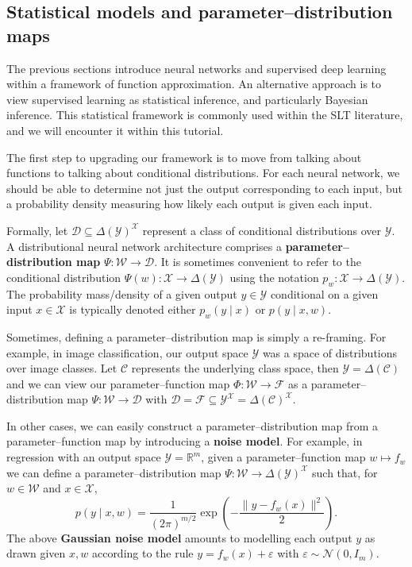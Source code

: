\documentclass[11pt]{article}
\newcommand{\R}{\mathbb{R}}
\newcommand{\X}{\mathcal{X}}
\newcommand{\Y}{\mathcal{Y}}
\newcommand{\W}{\mathcal{W}}
\newcommand{\F}{\mathcal{F}}
\newcommand{\D}{\mathcal{D}}
\newcommand{\C}{\mathcal{C}}
\begin{document}
\subsection{Statistical models and parameter--distribution maps}
\label{sec:prelims:stats}

The previous sections introduce neural networks and supervised deep learning
within a framework of function approximation. An alternative approach is to
view supervised learning as statistical inference, and particularly Bayesian
inference. This statistical framework is commonly used within the SLT
literature, and we will encounter it within this tutorial.

The first step to upgrading our framework is to move from talking about
functions to talking about conditional distributions. For each neural network,
we should be able to determine not just the output corresponding to each
input, but a probability density measuring how likely each output is given each
input.

Formally, let $\D \subseteq \Delta(\Y)^\X$ represent a class of
conditional distributions over $\Y$.
A distributional neural network architecture comprises a
\textbf{parameter--distribution map}
    $\Psi : \W \to \D$.
It is sometimes convenient to refer to the conditional distribution
    $\Psi(w) : \X \to \Delta(\Y)$
using the notation
    $p_w : \X \to \Delta(\Y)$.
The probability mass/density of a given output $y \in \Y$ conditional on a
given input $x \in \X$ is typically denoted either
    $p_w(y \mid x)$ or $p(y \mid x, w)$.

Sometimes, defining a parameter--distribution map is simply a re-framing. For
example, in image classification, our output space $\Y$ was a space of
distributions over image classes. Let $\C$ represents the underlying class
space, then $\Y = \Delta(\C)$ and we can view our parameter--function map
$\Phi : \W \to \F$ as a parameter--distribution map $\Psi : \W \to \D$ with
    $\D = \F \subseteq \Y^\X = \Delta(\C)^\X$.

In other cases, we can easily construct a parameter--distribution map from a
parameter--function map by introducing a \textbf{noise model}. For example, in
regression with an output space
    $\Y = \R^m$,
given a parameter--function map $w \mapsto f_w$ we can define a
parameter--distribution map
    $\Psi : \W \to \Delta(\Y)^\X$
such that, for $w\in\W$ and $x\in\X$,
\begin{equation}
\label{eq:gaussian-model}
    p(y \mid x, w) = \frac{1}{(2\pi)^{m/2}} 
    \exp\!\left(-\frac{\|y - f_w(x)\|^2}{2}\right).
\end{equation}
The above \textbf{Gaussian noise model} amounts to modelling each output $y$ as
drawn given $x, w$ according to the rule $y = f_w(x) + \varepsilon$ with
$\varepsilon \sim \mathcal{N}(0, I_m)$.
\end{document}
